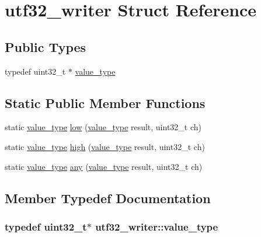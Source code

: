 \hypertarget{structutf32__writer}{\section{utf32\-\_\-writer Struct Reference}
\label{structutf32__writer}
}
\subsection*{Public Types}
\begin{DoxyCompactItemize}
\item 
typedef uint32\-\_\-t $\ast$ \hyperlink{structutf32__writer_a2284e1fa3406f113f151ded2aaa8d4ae}{value\-\_\-type}
\end{DoxyCompactItemize}
\subsection*{Static Public Member Functions}
\begin{DoxyCompactItemize}
\item 
static \hyperlink{structutf32__writer_a2284e1fa3406f113f151ded2aaa8d4ae}{value\-\_\-type} \hyperlink{structutf32__writer_a06e1b65906f7355ea54a622248095bc7}{low} (\hyperlink{structutf32__writer_a2284e1fa3406f113f151ded2aaa8d4ae}{value\-\_\-type} result, uint32\-\_\-t ch)
\item 
static \hyperlink{structutf32__writer_a2284e1fa3406f113f151ded2aaa8d4ae}{value\-\_\-type} \hyperlink{structutf32__writer_a3f86d996cde3ed7cab5c31930b67c9f1}{high} (\hyperlink{structutf32__writer_a2284e1fa3406f113f151ded2aaa8d4ae}{value\-\_\-type} result, uint32\-\_\-t ch)
\item 
static \hyperlink{structutf32__writer_a2284e1fa3406f113f151ded2aaa8d4ae}{value\-\_\-type} \hyperlink{structutf32__writer_aa94aaa4a13e755942e7da70ea7700d3e}{any} (\hyperlink{structutf32__writer_a2284e1fa3406f113f151ded2aaa8d4ae}{value\-\_\-type} result, uint32\-\_\-t ch)
\end{DoxyCompactItemize}


\subsection{Member Typedef Documentation}
\hypertarget{structutf32__writer_a2284e1fa3406f113f151ded2aaa8d4ae}{
\subsubsection[{value\-\_\-type}]{\setlength{\rightskip}{0pt plus 5cm}typedef uint32\-\_\-t$\ast$ {\bf utf32\-\_\-writer\-::value\-\_\-type}}}\label{structutf32__writer_a2284e1fa3406f113f151ded2aaa8d4ae}



